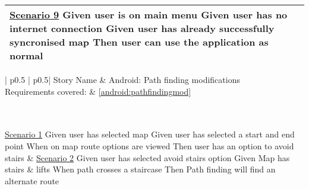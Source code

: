\begin{longtable}{| p{} | p{}|}
	\newline\underline{Scenario 9}\newline
	Given user is on main menu \newline
	Given user has no internet connection\newline
	Given user has already successfully syncronised map \newline
	Then user can use the application as normal\newline
	&
	\\\hline
\end{longtable}

\begin{longtable}{| p{} | p{}|}
	\hline
	\newline Story Name & \newline Android: Path finding modifications\\\hline
	\newline Requirements covered: & \newline \ref{android:pathfindingmod}\\\hline
	\\\hline
	\\\hline

	\newline\underline{Scenario 1}\newline
	Given user has selected map \newline
	Given user has selected a start and end point \newline
	When on map route options are viewed \newline 
	Then user has an option to avoid stairs\newline
	&
	\newline\underline{Scenario 2}\newline
	Given user has selected avoid stairs option \newline
	Given Map has stairs \& lifts \newline
	When path crosses a staircase \newline 
	Then Path finding will find an alternate route\newline
	\\\hline
\end{longtable}

